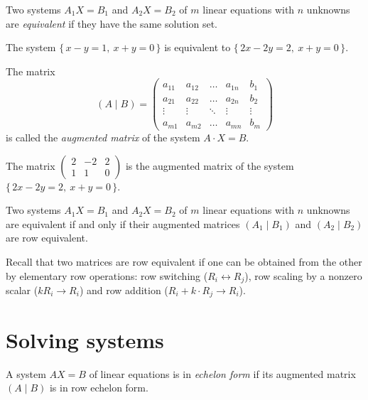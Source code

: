 \begin{definition}
Two systems $A_1 X = B_1$ and $A_2 X = B_2$ of $m$ linear equations with $n$ unknowns are \emph{equivalent}
if they have the same solution set.
\end{definition}

\begin{example}
The system $\{\,x - y = 1,\ x + y = 0\,\}$ is equivalent to $\{\,2x - 2y = 2,\ x + y = 0\,\}$.
\end{example}

\begin{definition}
The matrix
\[
(A\mid B) = \left( \begin{array}{cccc|c}
a_{11} & a_{12} & \ldots & a_{1n} & b_1 \\
a_{21} & a_{22} & \ldots & a_{2n} & b_2\\
\vdots & \vdots & \ddots & \vdots & \vdots \\
a_{m1} & a_{m2} & \ldots & a_{mn} & b_m
\end{array} \right)
\]
is called the \emph{augmented matrix} of the system $A\cdot X = B$.
\end{definition}

\begin{example}
The matrix
$\left( \begin{array}{cc|c} 2 & -2 & 2\\ 1 & 1 & 0 \end{array} \right)$
is the augmented matrix of the system $\{\,2x - 2y = 2,\ x + y = 0\,\}$.
\end{example}

\begin{theorem}
Two systems $A_1 X = B_1$ and $A_2 X= B_2$ of $m$ linear equations with $n$ unknowns are equivalent if and
only if their augmented matrices $(A_1\mid B_1)$ and $(A_2\mid B_2)$ are row equivalent.
\end{theorem}

\noindent Recall that two matrices are row equivalent if one can be obtained from the other by elementary row
operations: row switching ($R_i\leftrightarrow R_j$), row scaling by a nonzero scalar
($kR_i\rightarrow R_i$) and row addition ($R_i+k\cdot R_j\rightarrow R_i$).

\section{Solving systems}

\begin{definition}
A system $AX=B$ of linear equations is in \emph{echelon form} if its augmented matrix $(A\mid B)$ is in row
echelon form.
\end{definition}

